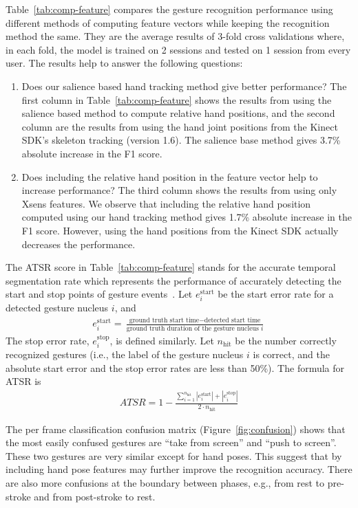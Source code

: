 \documentclass{sig-alternate-2013}
\begin{document}
Table~\ref{tab:comp-feature} compares the gesture recognition performance using
different methods of computing feature vectors while keeping the recognition
method the same.
They are the average results of 3-fold cross validations where, in each fold, the model is trained on 2 sessions and tested on 1 session from every user.
The results help to answer the following questions:
\begin{enumerate}
  \item Does our salience based hand tracking method give better performance?
  The first column in Table~\ref{tab:comp-feature} shows the results from
  using the salience based method to compute relative hand positions, and the
  second column are the results from using the hand joint positions from the
  Kinect SDK's skeleton tracking (version 1.6). The salience base method gives
  3.7\% absolute increase in the F1 score.
  \item Does including the relative hand position in the feature vector help to
  increase performance? The third column shows the results from using only Xsens
  features. We observe that including the relative hand position computed
  using our hand tracking method gives 1.7\% absolute increase in the F1 score.
  However, using the hand positions from the Kinect SDK actually decreases the
  performance.
\end{enumerate}

The ATSR score in Table~\ref{tab:comp-feature} stands for the accurate temporal
segmentation rate which represents the performance of accurately
detecting the start and stop points of gesture events~\cite{Ruffieux2013}.
Let $e^\text{start}_i$ be the start error rate for a detected gesture nucleus
$i$, and
\begin{align*}
e^\text{start}_i = \frac{\text{ground truth start time} - \text{detected start
time}}{\text{ground truth duration of the gesture nucleus }i}
\end{align*}
The stop error rate, $e_i^\text{stop}$, is defined similarly.
Let $n_{\text{hit}}$ be the number correctly recognized gestures (i.e., the
label of the gesture nucleus $i$ is correct, and the absolute start error and
the stop error rates are less than 50\%). The formula for ATSR
is
\begin{align*}
ATSR = 1 - \frac{\sum_{i = 1}^{n_{\text{hit}}} |e^\text{start}_i| +
|e_i^\text{stop}|}{2\cdot n_{\text{hit}}}
\end{align*}

The per frame classification confusion matrix (Figure~\ref{fig:confusion}) shows that the most easily confused gestures are ``take from screen'' and ``push to screen''. These two gestures are very similar except for hand
poses. This suggest that by including hand pose features may further improve
the recognition accuracy. There are also more confusions at the boundary between phases, e.g., 
from rest to pre-stroke and from post-stroke to rest.
\end{document}
